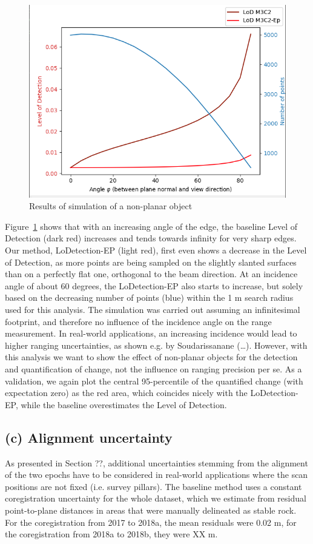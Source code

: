 \documentclass[preprint,12pt,3p]{elsarticle}
\begin{document}
\begin{figure}
    \centering
    \includegraphics[width=0.9\linewidth]{figs/experiment2.png}
    \caption{Results of simulation of a non-planar object}
    \label{fig:plot_b}
\end{figure}

Figure~\ref{fig:plot_b} shows that with an increasing angle of the edge, the baseline Level of Detection (dark red) increases and tends towards infinity for very sharp edges. Our method, LoDetection-EP (light red), first even shows a decrease in the Level of Detection, as more points are being sampled on the slightly slanted surfaces than on a perfectly flat one, orthogonal to the beam direction. At an incidence angle of about 60 degrees, the LoDetection-EP also starts to increase, but solely based on the decreasing number of points (blue) within the 1 m search radius used for this analysis. The simulation was carried out assuming an infinitesimal footprint, and therefore no influence of the incidence angle on the range measurement. In real-world applications, an increasing incidence would lead to higher ranging uncertainties, as shown e.g. by Soudarissanane (…). However, with this analysis we want to show the effect of non-planar objects for the detection and quantification of change, not the influence on ranging precision per se.
As a validation, we again plot the central 95-percentile of the quantified change (with expectation zero) as the red area, which coincides nicely with the LoDetection-EP, while the baseline overestimates the Level of Detection.  

\subsection{(c) Alignment uncertainty}
\label{sec:results-c}
As presented in Section ??, additional uncertainties stemming from the alignment of the two epochs have to be considered in real-world applications where the scan positions are not fixed (i.e. survey pillars). The baseline method uses a constant coregistration uncertainty for the whole dataset, which we estimate from residual point-to-plane distances in areas that were manually delineated as stable rock. For the coregistration from 2017 to 2018a, the mean residuals were 0.02 m, for the coregistration from 2018a to 2018b, they were XX m.
\end{document}
